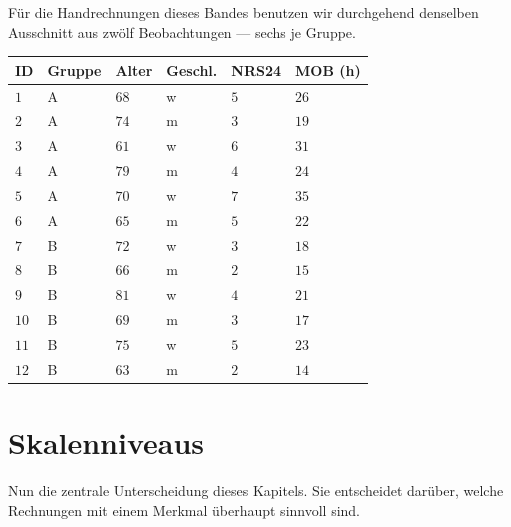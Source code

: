 \begin{merksatz}
Für die Handrechnungen dieses Bandes benutzen wir durchgehend denselben Ausschnitt aus zwölf Beobachtungen --- sechs je Gruppe.

\begin{center}
{\small
\renewcommand{\arraystretch}{1.32}
\begin{tabular}{@{}P{0.9cm}P{1.3cm}P{1.2cm}P{1.5cm}P{1.3cm}P{1.5cm}@{}}
\toprule
\textbf{ID} & \textbf{Gruppe} & \textbf{Alter} & \textbf{Geschl.} & \textbf{NRS24} & \textbf{MOB (h)}\\
\midrule
$1$ & A & $68$ & w & $5$ & $26$\\
$2$ & A & $74$ & m & $3$ & $19$\\
$3$ & A & $61$ & w & $6$ & $31$\\
$4$ & A & $79$ & m & $4$ & $24$\\
$5$ & A & $70$ & w & $7$ & $35$\\
$6$ & A & $65$ & m & $5$ & $22$\\
\midrule
$7$ & B & $72$ & w & $3$ & $18$\\
$8$ & B & $66$ & m & $2$ & $15$\\
$9$ & B & $81$ & w & $4$ & $21$\\
$10$ & B & $69$ & m & $3$ & $17$\\
$11$ & B & $75$ & w & $5$ & $23$\\
$12$ & B & $63$ & m & $2$ & $14$\\
\bottomrule
\end{tabular}}
\end{center}

\begin{center}
\begin{minipage}{0.88\textwidth}
\end{minipage}
\end{center}
\end{merksatz}

\section{Skalenniveaus}

Nun die zentrale Unterscheidung dieses Kapitels. Sie entscheidet darüber, welche Rechnungen mit einem Merkmal überhaupt sinnvoll sind.

